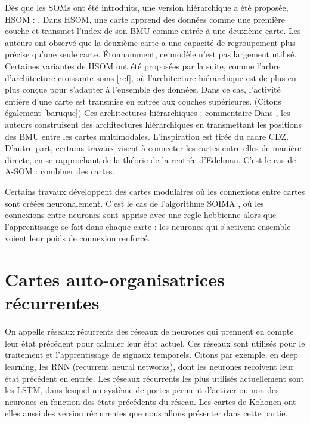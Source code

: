 Dès que les SOMs ont été introduits, une version hiérarchique a été proposée, HSOM : \cite{lampinen_clustering_1992,koikkalainen_self-organizing_1990} . Dans HSOM, une carte apprend des données comme une première couche et transmet l'index de son BMU comme entrée à une deuxième carte. Les auteurs ont observé que la deuxième carte a une capacité de regroupement plus précise qu'une seule carte. Étonnamment, ce modèle n'est pas largement utilisé. Certaines variantes de HSOM ont été proposées par la suite, comme l'arbre d'architecture croissante soms [ref], où l'architecture hiérarchique est de plus en plus conçue pour s'adapter à l'ensemble des données. Dans ce cas, l'activité entière d'une carte est transmise en entrée aux couches supérieures. (Citons également [baruque])
Ces architectures hiérarchiques : commentaire
Dans \cite{dominey13}, les auteurs construisent des architectures hiérarchiques en transmettant les positions des BMU entre les cartes multimodales. L'inspiration est tirée du cadre CDZ.
D'autre part, certains travaux visent à connecter les cartes entre elles de manière directe, en se rapprochant de la théorie de la rentrée d'Edelman. C'est le cas de A-SOM : combiner des cartes.

Certains travaux développent des cartes modulaires où les connexions entre cartes sont créées neuronalement. C'est le cas de l'algorithme SOIMA \cite{SOIMA}, où les connexions entre neurones sont apprise avce une regle hebbienne alors que l'apprentissage se fait dans chaque carte : les neurones qui s'activent ensemble voient leur poids de connexion renforcé.

\section{Cartes auto-organisatrices récurrentes}

On appelle réseaux récurrents des réseaux de neurones qui prennent en compte leur état précédent pour calculer leur état actuel. Ces réseaux sont utilisés pour le traitement et l'apprentissage de signaux temporels. Citons par exemple, en deep learning, les RNN (recurrent neural networks), dont les neurones recoivent leur état précédent en entrée. Les réseaux récurrents les plus utilisés actuellement sont les LSTM, dans lesquel un système de portes perment d'activer ou non des neurones en fonction des états précédents du réseau. Les cartes de Kohonen ont elles aussi des version récurrentes que nous allons présenter dans cette partie.

